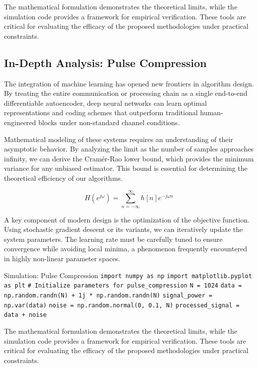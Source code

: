 \vspace{0.5cm}
The mathematical formulation demonstrates the theoretical limits, while the simulation code provides a framework for empirical verification. These tools are critical for evaluating the efficacy of the proposed methodologies under practical constraints.


\subsection{In-Depth Analysis: Pulse Compression}
The integration of machine learning has opened new frontiers in algorithm design. By treating the entire communication or processing chain as a single end-to-end differentiable autoencoder, deep neural networks can learn optimal representations and coding schemes that outperform traditional human-engineered blocks under non-standard channel conditions.

Mathematical modeling of these systems requires an understanding of their asymptotic behavior. By analyzing the limit as the number of samples approaches infinity, we can derive the Cramér-Rao lower bound, which provides the minimum variance for any unbiased estimator. This bound is essential for determining the theoretical efficiency of our algorithms.

\begin{equation}
    H(e^{j\omega}) = \sum_{n=-\infty}^{\infty} h[n] e^{-j\omega n}
\end{equation}

A key component of modern design is the optimization of the objective function. Using stochastic gradient descent or its variants, we can iteratively update the system parameters. The learning rate must be carefully tuned to ensure convergence while avoiding local minima, a phenomenon frequently encountered in highly non-linear parameter spaces.

\begin{pythonbox}{Simulation: Pulse Compression}
\texttt{import numpy as np}
\texttt{import matplotlib.pyplot as plt}
\texttt{}
\texttt{\# Initialize parameters for pulse\_compression}
\texttt{N = 1024}
\texttt{data = np.random.randn(N) + 1j * np.random.randn(N)}
\texttt{signal\_power = np.var(data)}
\texttt{noise = np.random.normal(0, 0.1, N)}
\texttt{processed\_signal = data + noise}
\end{pythonbox}

\vspace{0.5cm}
The mathematical formulation demonstrates the theoretical limits, while the simulation code provides a framework for empirical verification. These tools are critical for evaluating the efficacy of the proposed methodologies under practical constraints.


